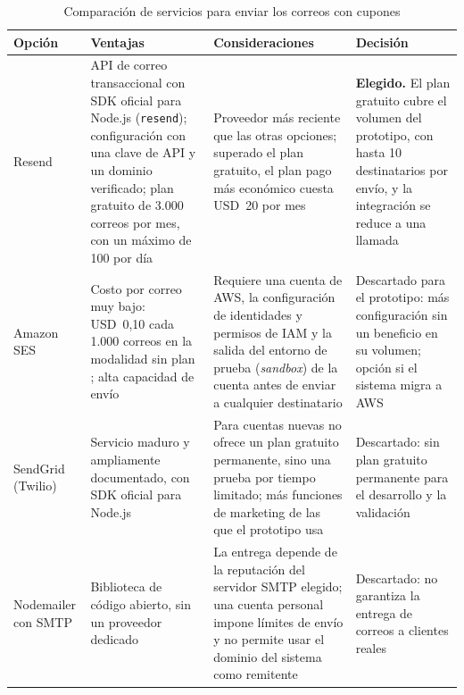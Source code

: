 \begin{table}[!htbp]
\centering
\caption{Comparación de servicios para enviar los correos con cupones}
\label{tab:comparativo_correo}
\renewcommand{\arraystretch}{1.3}
\begin{tabular}{|m{2.3cm}|m{4.4cm}|m{4.4cm}|m{3.4cm}|}
\hline
\textbf{Opción} & \textbf{Ventajas} & \textbf{Consideraciones} & \textbf{Decisión} \\
\hline
Resend & API de correo transaccional con SDK oficial para Node.js (\texttt{resend}); configuración con una clave de API y un dominio verificado; plan gratuito de 3.000 correos por mes, con un máximo de 100 por día \parencite{ResendPricing2026} & Proveedor más reciente que las otras opciones; superado el plan gratuito, el plan pago más económico cuesta USD~20 por mes \parencite{ResendPricing2026} & \textbf{Elegido.} El plan gratuito cubre el volumen del prototipo, con hasta 10 destinatarios por envío, y la integración se reduce a una llamada \\
\hline
Amazon SES & Costo por correo muy bajo: USD~0,10 cada 1.000 correos en la modalidad sin plan \parencite{AmazonSESPricing2026}; alta capacidad de envío & Requiere una cuenta de AWS, la configuración de identidades y permisos de IAM y la salida del entorno de prueba (\emph{sandbox}) de la cuenta antes de enviar a cualquier destinatario & Descartado para el prototipo: más configuración sin un beneficio en su volumen; opción si el sistema migra a AWS \\
\hline
SendGrid (Twilio) & Servicio maduro y ampliamente documentado, con SDK oficial para Node.js & Para cuentas nuevas no ofrece un plan gratuito permanente, sino una prueba por tiempo limitado; más funciones de marketing de las que el prototipo usa & Descartado: sin plan gratuito permanente para el desarrollo y la validación \\
\hline
Nodemailer con SMTP & Biblioteca de código abierto, sin un proveedor dedicado & La entrega depende de la reputación del servidor SMTP elegido; una cuenta personal impone límites de envío y no permite usar el dominio del sistema como remitente & Descartado: no garantiza la entrega de correos a clientes reales \\
\hline
\end{tabular}
\end{table}

